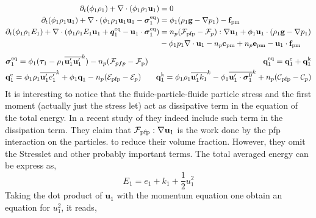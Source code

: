 \begin{align}
    \partial_t (\phi_1 \rho_1)  
    + \mathbf{\nabla}\cdot (
        \phi_1 \rho_1\textbf{u}_1
    )
    &= 
    0\\
    \partial_t (\phi_1 \rho_1\textbf{u}_1)  
    + \mathbf{\nabla}\cdot (
        \phi_1 \rho_1\textbf{u}_1\textbf{u}_1
        - \bm{\sigma}_1^\text{eq}
    )
    &= 
    \phi_1  (\rho_1\textbf{g} - \mathbf{\nabla} p_1 )
    -  \textbf{f}_\text{pm}\\
    \partial_t (\phi_1\rho_1E_1)  
    + \mathbf{\nabla}\cdot (
        \phi_1\rho_1E_1\textbf{u}_1
        + \bm{q}_1^\text{eq}
        - \textbf{u}_1 \cdot \bm{\sigma}_1^\text{eq}
        )
    &= 
    n_p (\mathcal{F}_\text{pfp} - \mathcal{F}_p):\mathbf{\nabla} \textbf{u}_1
    + \phi_1 \textbf{u}_1 \cdot (\rho_1\textbf{g}
    - \mathbf{\nabla} p_1 
    )\nonumber \\ 
    &- \phi_1 p_1 \mathbf{\nabla}\cdot \textbf{u}_1
    - n_p \textbf{c}_\text{pm}
    + n_p \textbf{e}_\text{pm}
    - \textbf{u}_1 \cdot \textbf{f}_\text{pm}
\end{align} 
\begin{align*}
    &\bm{\sigma}_1^\text{eq}
    = \phi_1 (
        \bm{\tau}_1%
        - \rho_1\kavg{\textbf{u}_1'\textbf{u}_1'}) 
        - n_p  (\mathcal{F}_{pfp} - \mathcal{F}_\text{p})
    &\textbf{q}_1^\text{eq}
    =\textbf{q}_1^\text{e} 
    +\textbf{q}_1^\text{k}  \\
    &\textbf{q}_1^\text{e}
    = \phi_1\rho_1 \kavg{\textbf{u}_1' e_1'} 
    + \phi_1\textbf{q}_1 
    - n_p (\mathcal{E}_\text{pfp} - \mathcal{E}_p)
    &\textbf{q}_1^\text{k}
    = \phi_1\rho_1 \kavg{\textbf{u}_1' k_1} 
    - \phi_1\kavg{\textbf{u}_1' \cdot \bm{\sigma}_1^0}
    + n_p (\mathcal{C}_\text{pfp} - \mathcal{C}_p)
\end{align*}
It is interesting to notice that the fluide-particle-fluide particle stress and the first moment (actually just the stress let) act as dissipative term in the equation of the total energy. 
In a recent study of \citet{boniou2023shock} they indeed include such term in the dissipation term. 
They claim that $\mathcal{F}_\text{pfp} : \mathbf{\nabla} \textbf{u}_1 $ is the work done by the pfp interaction on the particles.
to reduce their volume fraction. 
However, they omit the Stresslet and other probably important terms. 
The total averaged energy can be express as, 
\begin{equation*}
    E_1 = e_1 + k_1 + \frac{1}{2}u^2_1 
\end{equation*}
Taking the dot product of $\textbf{u}_1$ with the momentum equation one obtain an equation for $u^2_1$, it reads, 
